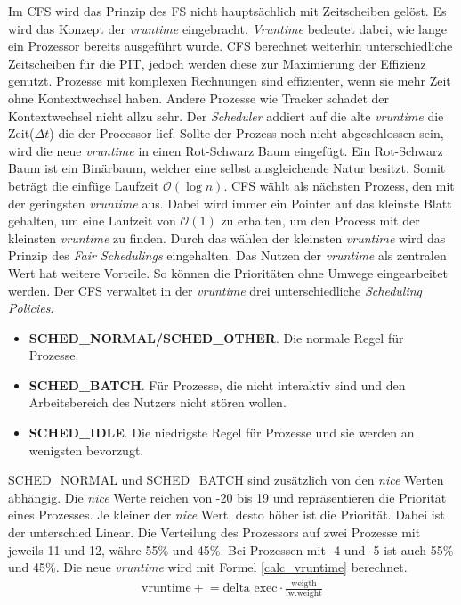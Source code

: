 Im CFS wird das Prinzip des FS nicht hauptsächlich mit Zeitscheiben gelöst. Es wird das Konzept der \textit{vruntime} eingebracht. \textit{Vruntime} bedeutet dabei, wie lange ein Prozessor bereits ausgeführt wurde. CFS berechnet weiterhin unterschiedliche Zeitscheiben für die PIT, jedoch werden diese zur Maximierung der Effizienz genutzt. Prozesse mit komplexen Rechnungen sind effizienter, wenn sie mehr Zeit ohne Kontextwechsel haben. Andere Prozesse wie Tracker schadet der Kontextwechsel nicht allzu sehr. Der \textit{Scheduler} addiert auf die alte \textit{vruntime} die Zeit($\Delta t$) die der Processor lief. Sollte der Prozess noch nicht abgeschlossen sein, wird die neue \textit{vruntime} in einen Rot-Schwarz Baum eingefügt. Ein Rot-Schwarz Baum ist ein Binärbaum, welcher eine selbst ausgleichende Natur besitzt. Somit beträgt die einfüge Laufzeit $\mathcal{O}(\log n)$. CFS wählt als nächsten Prozess, den mit der geringsten \textit{vruntime} aus. Dabei wird immer ein Pointer auf das kleinste Blatt gehalten, um eine Laufzeit von $\mathcal{O}(1)$ zu erhalten, um den Process mit der kleinsten \textit{vruntime} zu finden. Durch das wählen der kleinsten \textit{vruntime} wird das Prinzip des \textit{Fair Schedulings} eingehalten.
\medskip
\newpage
Das Nutzen der \textit{vruntime} als zentralen Wert hat weitere Vorteile. So können die Prioritäten ohne Umwege eingearbeitet werden. Der CFS verwaltet in der \textit{vruntime} drei unterschiedliche \textit{Scheduling Policies}.
\begin{itemize}
    \item \textbf{SCHED\_NORMAL/SCHED\_OTHER}. Die normale Regel für Prozesse.
    \item \textbf{SCHED\_BATCH}. Für Prozesse, die nicht interaktiv sind und den Arbeitsbereich des Nutzers nicht stören wollen.
    \item \textbf{SCHED\_IDLE}. Die niedrigste Regel für Prozesse und sie werden an wenigsten bevorzugt.
\end{itemize}
SCHED\_NORMAL und SCHED\_BATCH sind zusätzlich von den \textit{nice} Werten abhängig. Die \textit{nice} Werte reichen von -20 bis 19 und repräsentieren die Priorität eines Prozesses. Je kleiner der \textit{nice} Wert, desto höher ist die Priorität. Dabei ist der unterschied Linear. Die Verteilung des Prozessors auf zwei Prozesse mit jeweils 11 und 12, währe 55\% und 45\%. Bei Prozessen mit -4 und -5 ist auch 55\% und 45\%. Die neue \textit{vruntime} wird mit Formel \ref{calc_vruntime}\cite{Linux:Torvalds} berechnet.
\begin{align}
    \text{vruntime} \mathrel{+}= \text{delta\_exec} \cdot \frac{\text{weigth}}{\text{lw.weight}}
    \label{calc_vruntime}
\end{align}
